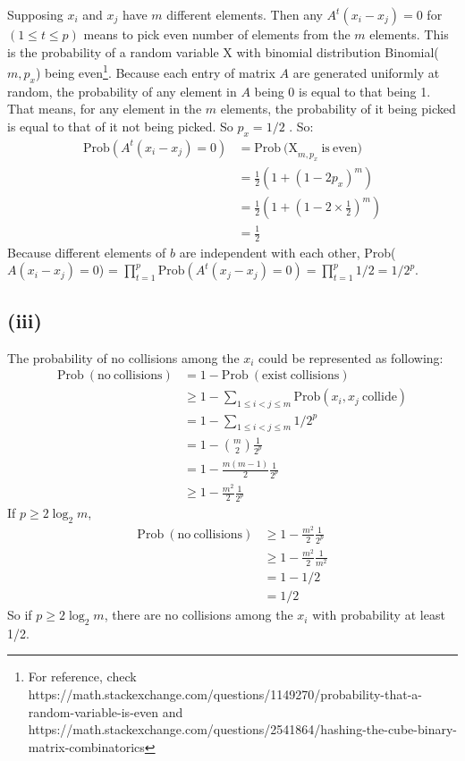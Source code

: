 \documentclass[]{homework}
\begin{document}
Supposing $x_i$ and $x_j$ have $m$ different elements.
Then any $A^t(x_i - x_j) = 0$ for  $(1 \le t \le p)$ means to pick even number of elements from the $m$ elements.
This is the probability of a random variable X with binomial distribution Binomial($m, p_x$) being even\footnote{For reference, check https://math.stackexchange.com/questions/1149270/probability-that-a-random-variable-is-even and https://math.stackexchange.com/questions/2541864/hashing-the-cube-binary-matrix-combinatorics}.
Because each entry of matrix $A$ are generated uniformly at random, the probability of any element in $A$ being 0 is equal to that being 1.
That means, for any element in the $m$ elements, the probability of it being picked is equal to that of it not being picked.
So $p_x = 1/2$ .
So:
\begin{equation}
\begin{split}
\mathrm{Prob}(A^t(x_i - x_j) = 0) &= \mathrm{Prob\ (X}_{m, p_x}\mathrm{\ is\ even})\\
&= \frac{1}{2} (1 + (1-2p_x)^m) \\
&= \frac{1}{2} (1 + (1-2 \times \frac{1}{2})^m) \\
&= \frac{1}{2}
\end{split}
\end{equation}
Because different elements of $b$ are independent with each other,
Prob($A(x_i - x_j) = 0$) = $\prod\limits_{t=1}^p \mathrm{Prob}(A^t(x_j - x_j) = 0) = \prod\limits_{t=1}^p 1/2 = 1/2^p.$


\subsection*{(iii)}
The probability of no collisions among the $x_i$ could be represented as following:
%
\begin{equation}
\begin{split}
\mathrm{Prob\ (no\ collisions)} &= 1 - \mathrm{Prob\ (exist\ collisions)} \\
				       &\ge 1 - \sum\limits_{1\le i <j \le m} \mathrm{Prob}(x_i, x_j \mathrm{\ collide})\\
				       &= 1 -  \sum\limits_{1\le i <j \le m} 1/2^p \\
				       &= 1 - \binom{m}{2} \frac{1}{2^p} \\
				       &= 1- \frac{m(m-1)}{2}\frac{1}{2^p} \\
				       &\ge 1 - \frac{m^2}{2}\frac{1}{2^p}
\end{split}
\end{equation}
%
 If $p \ge 2 \log_2 m$,
\begin{equation}
\begin{split}
\mathrm{Prob\ (no\ collisions)} &\ge  1- \frac{m^2}{2}\frac{1}{2^p} \\
					&\ge 1 - \frac{m^2}{2} \frac{1}{m^2} \\
					&= 1 - 1/2 \\
					&= 1/2
\end{split}
\end{equation}
%
 So if  $p \ge 2 \log_2 m$, there are no collisions among the $x_i$ with probability at least 1/2.
\end{document}
